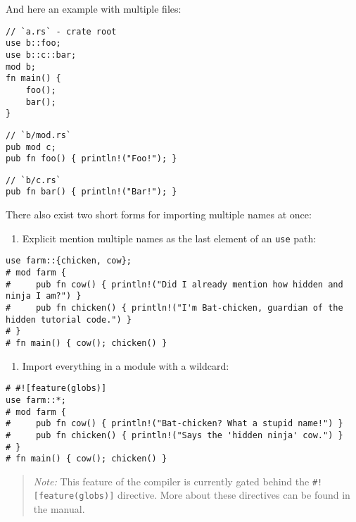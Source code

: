 \documentclass[]{article}
\begin{document}
And here an example with multiple files:

\begin{verbatim}
// `a.rs` - crate root
use b::foo;
use b::c::bar;
mod b;
fn main() {
    foo();
    bar();
}
\end{verbatim}

\begin{verbatim}
// `b/mod.rs`
pub mod c;
pub fn foo() { println!("Foo!"); }
\end{verbatim}

\begin{verbatim}
// `b/c.rs`
pub fn bar() { println!("Bar!"); }
\end{verbatim}

There also exist two short forms for importing multiple names at once:

\begin{enumerate}
\def\labelenumi{\arabic{enumi}.}
\itemsep1pt\parskip0pt
\item
  Explicit mention multiple names as the last element of an \texttt{use}
  path:
\end{enumerate}

\begin{verbatim}
use farm::{chicken, cow};
# mod farm {
#     pub fn cow() { println!("Did I already mention how hidden and ninja I am?") }
#     pub fn chicken() { println!("I'm Bat-chicken, guardian of the hidden tutorial code.") }
# }
# fn main() { cow(); chicken() }
\end{verbatim}

\begin{enumerate}
\def\labelenumi{\arabic{enumi}.}
\setcounter{enumi}{1}
\itemsep1pt\parskip0pt
\item
  Import everything in a module with a wildcard:
\end{enumerate}

\begin{verbatim}
# #![feature(globs)]
use farm::*;
# mod farm {
#     pub fn cow() { println!("Bat-chicken? What a stupid name!") }
#     pub fn chicken() { println!("Says the 'hidden ninja' cow.") }
# }
# fn main() { cow(); chicken() }
\end{verbatim}

\begin{quote}
\emph{Note:} This feature of the compiler is currently gated behind the
\texttt{\#!{[}feature(globs){]}} directive. More about these directives
can be found in the manual.
\end{quote}
\end{document}

